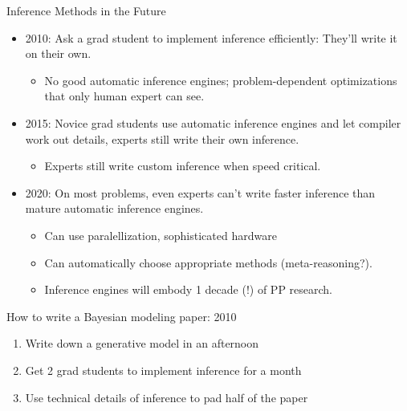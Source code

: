 \begin{frame}{Inference Methods in the Future}
  \begin{itemize}
    \item 2010: Ask a grad student to implement inference efficiently:  They'll write it on their own.
    \begin{itemize}
      \item No good automatic inference engines; problem-dependent optimizations that only human expert can see.
    \end{itemize}
    \vspace{\baselineskip}
    \item 2015: Novice grad students use automatic inference engines and let compiler work out details, experts still write their own inference.
    \begin{itemize}
      \item Experts still write custom inference when speed critical.
    \end{itemize}
    \vspace{\baselineskip}
    \item 2020: On most problems, even experts can't write faster inference than mature automatic inference engines.
    \begin{itemize}
      \item Can use paralellization, sophisticated hardware
      \item Can automatically choose appropriate methods (meta-reasoning?).
      \item Inference engines will embody 1 decade (!) of PP research.
    \end{itemize}    
    \vspace{\baselineskip}
  \end{itemize}
\end{frame}


\begin{frame}{How to write a Bayesian modeling paper: 2010}
  \begin{block}{}
    \begin{enumerate}
      \item Write down a generative model in an afternoon
      \vspace{\baselineskip}
      \vspace{\baselineskip}
      \item Get 2 grad students to implement inference for a month
      \vspace{\baselineskip}
      \vspace{\baselineskip}
      \item Use technical details of inference to pad half of the paper
    \end{enumerate}
  \end{block}
\end{frame}

